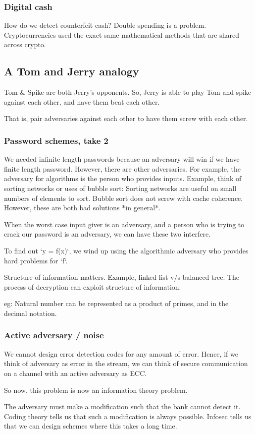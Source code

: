 \subsubsection{Digital cash}
How do we detect counterfeit cash? Double spending is a problem. Cryptocurrencies
used the exact same mathematical methods that are shared across crypto. 

\subsection{A Tom and Jerry analogy}
Tom \& Spike are both Jerry's opponents. So, Jerry is able to play Tom and spike
against each other, and have them beat each other. 

That is, pair adversaries against each other to have them screw with each other.

\subsubsection{Password schemes, take 2}
We needed infinite length passwords because an adversary will win if we have finite
length password. However, there are other adversaries. For example, the adversary
for algorithms is the person who provides inputs. Example, think of sorting networks
or uses of bubble sort: Sorting networks are useful on small numbers of elements
to sort. Bubble sort does not screw with cache coherence. However, these are both
bad solutions *in general*.
 
When the worst case input giver is an adversary, and a person who is trying to
crack our password is an adversary, we can have these two interfere.

To find out `y = f(x)`, we wind up using the algorithmic adversary who
provides hard problems for `f`.


Structure of information matters. Example, linked list v/s balanced tree. The
process of decryption can exploit structure of information.


eg: Natural number can be represented as a product of primes, and in the
decimal notation.


\subsubsection{Active adversary / noise}

We cannot design error detection codes for any amount of error. Hence, if
we think of adversary as error in the stream, we can think of secure communication
on a channel with an active adversary as ECC.

So now, this problem is now an information theory problem. 

The adversary must make a modification such that the bank cannot detect it.
Coding theory tells us that such a modification is always possible. Infosec
tells us that we can design schemes where this takes a long time.

